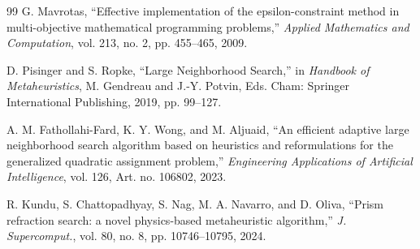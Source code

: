\documentclass[journal]{IEEEtran}
\theoremstyle{definition}
\theoremstyle{definition}
\theoremstyle{plain}
\begin{document}
\begin{thebibliography}{99}
    G. Mavrotas, ``Effective implementation of the epsilon-constraint method in multi-objective mathematical programming problems,'' \textit{Applied Mathematics and Computation}, vol. 213, no. 2, pp. 455--465, 2009.

    D. Pisinger and S. Ropke, ``Large Neighborhood Search,'' in \textit{Handbook of Metaheuristics}, M. Gendreau and J.-Y. Potvin, Eds. Cham: Springer International Publishing, 2019, pp. 99--127.

    A. M. Fathollahi-Fard, K. Y. Wong, and M. Aljuaid, ``An efficient adaptive large neighborhood search algorithm based on heuristics and reformulations for the generalized quadratic assignment problem,'' \textit{Engineering Applications of Artificial Intelligence}, vol. 126, Art. no. 106802, 2023.

    R. Kundu, S. Chattopadhyay, S. Nag, M. A. Navarro, and D. Oliva, ``Prism refraction search: a novel physics-based metaheuristic algorithm,'' \textit{J. Supercomput.}, vol. 80, no. 8, pp. 10746--10795, 2024.
    \end{thebibliography}
\end{document}

